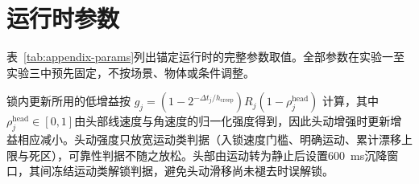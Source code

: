 \documentclass[review]{vgtc}
\begin{document}
\raggedbottom




\clearpage
\appendix

\section{运行时参数}\label{sec:appendix}

表~\ref{tab:appendix-params}列出锚定运行时的完整参数取值。全部参数在实验一至实验三中预先固定，不按场景、物体或条件调整。

锁内更新所用的低增益按
$g_j = (1 - 2^{-\Delta t_j / h_{\mathrm{creep}}}) R_j
(1 - \rho_j^{\mathrm{head}})$
计算，其中$\rho_j^{\mathrm{head}} \in [0,1]$由头部线速度与角速度的归一化强度得到，因此头动增强时更新增益相应减小。头动强度只放宽运动类判据（入锁速度门槛、明确运动、累计漂移上限与死区），可靠性判据不随之放松。头部由运动转为静止后设置600~ms沉降窗口，其间冻结运动类解锁判据，避免头动滑移尚未褪去时误解锁。
\end{document}
